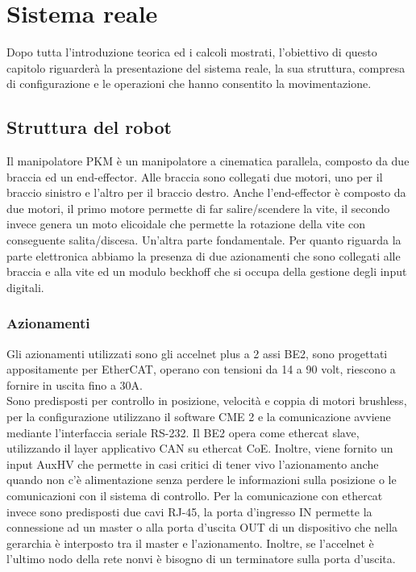 \section{Sistema reale}
Dopo tutta l'introduzione teorica ed i calcoli mostrati, l'obiettivo di questo capitolo riguarderà la presentazione del sistema reale, la sua struttura, compresa di configurazione e le operazioni che hanno consentito la movimentazione.
\subsection{Struttura del robot}
Il manipolatore PKM è un manipolatore a cinematica parallela, composto da due braccia ed un end-effector. Alle braccia sono collegati due motori, uno per il braccio sinistro e l'altro per il braccio destro. Anche l'end-effector è composto da due motori, il primo motore permette di far salire/scendere la vite, il secondo invece genera un moto elicoidale che permette la rotazione della vite con conseguente salita/discesa. Un'altra parte fondamentale.
Per quanto riguarda la parte elettronica abbiamo la presenza di due azionamenti che sono collegati alle braccia e alla vite ed un modulo beckhoff che si occupa della gestione degli input digitali.
\subsubsection{Azionamenti}
Gli azionamenti utilizzati sono gli accelnet plus a 2 assi BE2, sono progettati appositamente per EtherCAT, operano con tensioni da 14 a 90 volt, riescono a fornire in uscita fino a 30A.
\\Sono predisposti per controllo in posizione, velocità e coppia di motori brushless, per la configurazione utilizzano il software CME 2 e la comunicazione avviene mediante l'interfaccia seriale RS-232. Il BE2 opera come ethercat slave, utilizzando il layer applicativo CAN su ethercat CoE. Inoltre, viene fornito un input AuxHV che permette in casi critici di tener vivo l'azionamento anche quando non c'è alimentazione senza perdere le informazioni sulla posizione o le comunicazioni con il sistema di controllo.
Per la comunicazione con ethercat invece sono predisposti due cavi RJ-45, la porta d'ingresso IN permette la connessione ad un master o alla porta d'uscita OUT di un dispositivo che nella gerarchia è interposto tra il master e l'azionamento. Inoltre, se l'accelnet è l'ultimo nodo della rete nonvi è bisogno di un terminatore sulla porta d'uscita.
 
